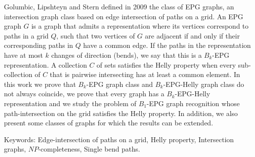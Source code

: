 \begin{foreignabstract}
Golumbic, Lipshteyn and Stern defined in 2009 the class of EPG graphs, an intersection graph class  based on edge intersection of paths on a grid. An EPG graph $G$ is a graph that admits a representation where its vertices correspond to paths in a grid $Q$, such that two vertices of $G$ are adjacent if and only if their corresponding paths in $Q$ have a common edge. If the paths in the representation have at most $k$ changes of direction  (bends), we say that this is a  $B_k$-EPG representation. A collection $C$ of sets satisfies the Helly property when every sub-collection of $C$ that is pairwise intersecting has at least a common element. In this work we prove that  $B_k$-EPG graph class and $B_k$-EPG-Helly graph class do not always coincide, we prove that every graph has a $B_k$-EPG-Helly representation and we study the problem of $B_1$-EPG graph recognition whose path-intersection on the grid satisfies the Helly property. In addition, we also present some classes of graphs for which the results can be extended.



Keywords: Edge-intersection of paths on a grid, Helly property, Intersection graphs, $NP$-completeness, Single bend paths.

\end{foreignabstract}

